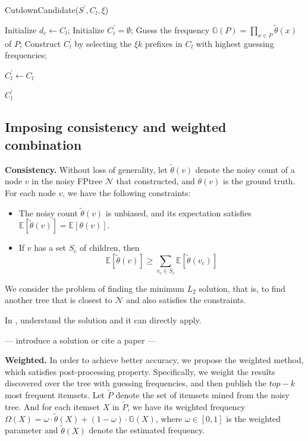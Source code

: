 \documentclass[conference]{IEEEtran}
\begin{document}
\begin{algorithm}[]
\caption{CutdownCandidate($S^{\prime},C_l,\xi$)}
\label{alg:cutdown candidate}
\begin{algorithmic}[1]

\STATE Initialize $d_c \gets C_l$;
\STATE Initialize $C^{\prime}_{i} = \emptyset$;
    \STATE Guess the frequency $\mathbb{G}(P)=\prod_{x \in P} \tilde{\theta}(x)$ of $P$;        
  \ENDFOR
  \STATE Construct $C^{\prime}_{l}$ by selecting the $\xi k$ prefixes in $C_l$ with highest guessing frequencies;

\ELSE
  \STATE $C^{\prime}_{l} \gets C_l$

\ENDIF 

\RETURN $C^{\prime}_{l}$
\end{algorithmic}
\end{algorithm}



\subsection{Imposing consistency and weighted combination}
\label{optimize}
\textbf{Consistency.} Without loss of generality, let $\tilde{\theta}(v)$ denote the noisy count of a node $v$ in the noisy FPtree $\mathcal{N}$ that constructed, and $\theta(v)$ is the ground truth. For each node $v$, we have the following constraints:
\begin{itemize}
\item The noisy count $\tilde{\theta}(v)$ is unbiased, and its expectation satisfies $\mathbb{E}[\tilde{\theta}(v)] = \mathbb{E}[\theta(v)]$.
\item If $v$ has a set $S_c$ of children, then\\
$$\mathbb{E}[\tilde{\theta}(v)] \geq \sum_{v_c \in S_c} \mathbb{E}[\tilde{\theta}(v_c)]$$
\end{itemize} 

We consider the problem of finding the minimum $L_2$ solution, that is, to find another tree that is closest to $\mathcal{N}$ and also satisfies the constraints.

{\color{red}In \cite{a5}, understand the solution and it can directly apply. }

{\color{red}--- introduce a solution or cite a paper ---}

\textbf{Weighted.} In order to achieve better accuracy, we propose the weighted method, which satisfies post-processing property. Specifically, we weight the results discovered over the tree with guessing frequencies, and then publish the $top-k$ most frequent itemsets. Let $\tilde{P}$ denote the set of itemsets mined from the noisy tree. And for each itemset $X$ in $\tilde{P}$, we have its weighted frequency $\Omega (X) = \omega \cdot \tilde{\theta}(X) + (1-\omega)\cdot \mathbb{G}(X)$, where $\omega \in [0,1]$ is the weighted parameter and $ \tilde{\theta}(X)$ denote the estimated frequency.
\end{document}
